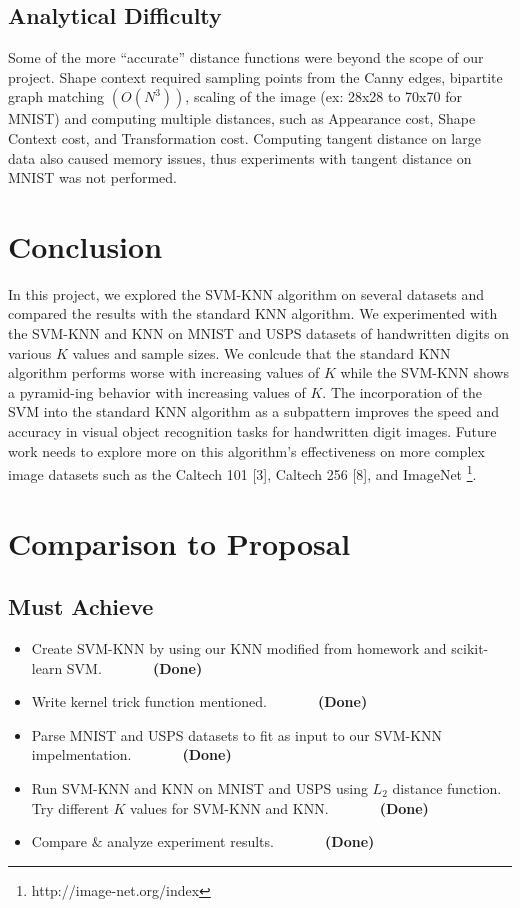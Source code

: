 \documentclass[11pt,letterpaper]{article}
\begin{document}
\subsection{Analytical Difficulty}

Some of the more ``accurate'' distance functions were beyond the scope of our project. Shape context required sampling points from the Canny edges, bipartite graph matching $(O(N^3))$, scaling of the image (ex: 28x28 to 70x70 for MNIST) and computing multiple distances, such as Appearance cost, Shape Context cost, and Transformation cost. Computing tangent distance on large data also caused memory issues, thus experiments with tangent distance on MNIST was not performed.


\section{Conclusion}

In this project, we explored the SVM-KNN algorithm on several datasets and compared the results with the standard KNN algorithm. We experimented with the SVM-KNN and KNN on MNIST and USPS datasets of handwritten digits on various $K$ values and sample sizes. We conlcude that the standard KNN algorithm performs worse with increasing values of $K$ while the SVM-KNN shows a pyramid-ing behavior with increasing values of $K$. The incorporation of the SVM into the standard KNN algorithm as a subpattern improves the speed and accuracy in visual object recognition tasks for handwritten digit images. Future work needs to explore more on this algorithm's effectiveness on more complex image datasets such as the Caltech 101 [3], Caltech 256 [8], and ImageNet \footnote{http://image-net.org/index}.

\section{Comparison to Proposal}

\subsection{Must Achieve}

\begin{itemize}
\item Create SVM-KNN by using our KNN modified from homework and scikit-learn SVM. $\>\>\>\>\>\>\>\>\>\>\>\>\>\>\>$\textbf{(Done)}
\item Write kernel trick function mentioned. $\>\>\>\>\>\>\>\>\>\>\>\>\>\>\>$\textbf{(Done)}
\item Parse MNIST and USPS datasets to fit as input to our SVM-KNN impelmentation. $\>\>\>\>\>\>\>\>\>\>\>\>\>\>\>$\textbf{(Done)}
\item Run SVM-KNN and KNN on MNIST and USPS using $L_2$ distance function. Try different $K$ values for SVM-KNN and KNN. $\>\>\>\>\>\>\>\>\>\>\>\>\>\>\>$\textbf{(Done)}
\item Compare $\&$ analyze experiment results. $\>\>\>\>\>\>\>\>\>\>\>\>\>\>\>$\textbf{(Done)}
\end{itemize}
\end{document}
